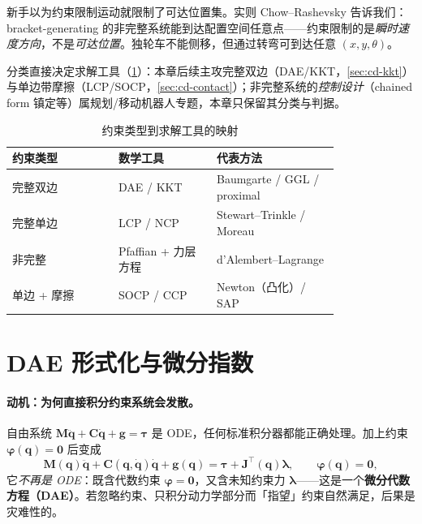\begin{pitfall}[概念误区：「nonholonomic = 到不了某些位置」]
新手以为约束限制运动就限制了可达位置集。实则 Chow--Rashevsky 告诉我们：bracket-generating 的非完整系统能到达配置空间任意点——约束限制的是\emph{瞬时速度方向}，不是\emph{可达位置}。独轮车不能侧移，但通过转弯可到达任意 $(x,y,\theta)$。
\end{pitfall}

分类直接决定求解工具（\cref{tab:cd-tool}）：本章后续主攻完整双边（DAE/KKT，\cref{sec:cd-kkt}）与单边带摩擦（LCP/SOCP，\cref{sec:cd-contact}）；非完整系统的\emph{控制设计}（chained form 镇定等）属规划/移动机器人专题，本章只保留其分类与判据。

\begin{table}[H]\centering\small
\caption{约束类型到求解工具的映射}
\label{tab:cd-tool}
\begin{tabular}{p{0.26\linewidth}p{0.24\linewidth}p{0.30\linewidth}}
\toprule
约束类型 & 数学工具 & 代表方法 \\
\midrule
完整双边 & DAE / KKT & Baumgarte / GGL / proximal \\
完整单边 & LCP / NCP & Stewart--Trinkle / Moreau \\
非完整 & Pfaffian + 力层方程 & d'Alembert--Lagrange \\
单边 + 摩擦 & SOCP / CCP & Newton（凸化）/ SAP \\
\bottomrule
\end{tabular}
\end{table}

\section{DAE 形式化与微分指数}
\label{sec:cd-dae}

\paragraph{动机：为何直接积分约束系统会发散。}
自由系统 $\mathbf M\ddot{\mathbf q}+\mathbf C\dot{\mathbf q}+\mathbf g=\boldsymbol\tau$ 是 ODE，任何标准积分器都能正确处理。加上约束 $\boldsymbol\varphi(\mathbf q)=\mathbf 0$ 后变成
\begin{equation}
  \mathbf M(\mathbf q)\ddot{\mathbf q}+\mathbf C(\mathbf q,\dot{\mathbf q})\dot{\mathbf q}+\mathbf g(\mathbf q)=\boldsymbol\tau+\mathbf J^\top(\mathbf q)\boldsymbol\lambda,\qquad \boldsymbol\varphi(\mathbf q)=\mathbf 0,
  \label{eq:cd-dae}
\end{equation}
它\emph{不再是 ODE}：既含代数约束 $\boldsymbol\varphi=\mathbf 0$，又含未知约束力 $\boldsymbol\lambda$——这是一个\textbf{微分代数方程（DAE）}。若忽略约束、只积分动力学部分而「指望」约束自然满足，后果是灾难性的。

